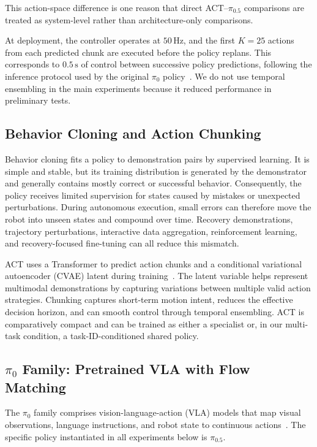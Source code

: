 \documentclass[10pt,conference]{IEEEtran}
\newcommand{\pio}{\ensuremath{\pi_0}}
\begin{document}
This action-space difference is one reason that direct ACT--$\pi_{0.5}$
comparisons are treated as system-level rather than architecture-only
comparisons.

At deployment, the controller operates at \(50\,\mathrm{Hz}\), and the first
\(K=25\) actions from each predicted chunk are executed before the policy
replans. This corresponds to \(0.5\,\mathrm{s}\) of control between successive
policy predictions, following the inference protocol used by the original
$\pi_0$ policy~\cite{black2024pi0}. We do not use temporal ensembling in the
main experiments because it reduced performance in preliminary tests.

\subsection{Behavior Cloning and Action Chunking}

Behavior cloning fits a policy to demonstration pairs by supervised learning.
It is simple and stable, but its training distribution is generated by the
demonstrator and generally contains mostly correct or successful behavior.
Consequently, the policy receives limited supervision for states caused by
mistakes or unexpected perturbations. During autonomous execution, small
errors can therefore move the robot into unseen states and compound over time.
Recovery demonstrations, trajectory perturbations, interactive data
aggregation, reinforcement learning, and recovery-focused fine-tuning can all
reduce this mismatch.

ACT uses a Transformer to predict action chunks and a conditional variational
autoencoder (CVAE) latent during training~\cite{zhao2023act}. The latent
variable helps represent multimodal demonstrations by capturing variations
between multiple valid action strategies. Chunking captures short-term motion
intent, reduces the effective decision horizon, and can smooth control through
temporal ensembling. ACT is comparatively compact and can be trained as either
a specialist or, in our multi-task condition, a task-ID-conditioned shared
policy.

\subsection{\texorpdfstring{\pio{} Family}{pi0 Family}: Pretrained VLA with Flow Matching}

The \pio{} family comprises vision-language-action (VLA) models that map visual
observations, language instructions, and robot state to continuous
actions~\cite{black2024pi0,black2025pi05}. The specific policy instantiated in
all experiments below is $\pi_{0.5}$.
\end{document}
